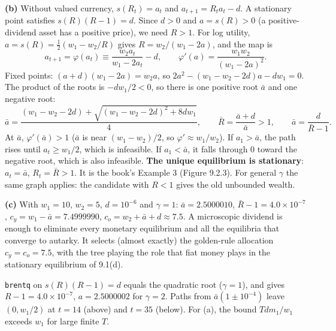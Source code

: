 \documentclass[12pt, letterpaper]{article}
\begin{document}
\begin{tcolorbox}[oddbox,title={Exercise 9.3 \quad A Lucas tree}]
\textbf{(b)} Without valued currency, $s(R_t)=a_t$ and $a_{t+1}=R_ta_t-d$. A stationary point
satisfies $s(R)(R-1)=d$. Since $d>0$ and $a=s(R)>0$ (a positive-dividend asset has a positive price),
we need $R>1$. For log utility, $a=s(R)=\frac12(w_1-w_2/R)$ gives $R=w_2/(w_1-2a)$, and the map is
\[
a_{t+1}=\varphi(a_t)\equiv\frac{w_2a_t}{w_1-2a_t}-d,\qquad \varphi'(a)=\frac{w_1w_2}{(w_1-2a)^2}.
\]
Fixed points: $(a+d)(w_1-2a)=w_2a$, so $2a^2-(w_1-w_2-2d)a-dw_1=0$. The product of the roots is
$-dw_1/2<0$, so there is one positive root $\bar a$ and one negative root:
\[
\bar a=\frac{(w_1-w_2-2d)+\sqrt{(w_1-w_2-2d)^2+8dw_1}}{4},\qquad \bar R=\frac{\bar a+d}{\bar a}>1,\qquad \bar a=\frac d{\bar R-1}.
\]
At $\bar a$, $\varphi'(\bar a)>1$ ($\bar a$ is near $(w_1-w_2)/2$, so $\varphi'\approx w_1/w_2$). If
$a_1>\bar a$, the path rises until $a_t\ge w_1/2$, which is infeasible. If $a_1<\bar a$, it falls
through $0$ toward the negative root, which is also infeasible. \textbf{The unique equilibrium is
stationary}: $a_t=\bar a$, $R_t=\bar R>1$. It is the book's Example 3 (Figure 9.2.3). For general
$\gamma$ the same graph applies: the candidate with $R<1$ gives the old unbounded wealth.

\textbf{(c)} With $w_1=10$, $w_2=5$, $d=10^{-6}$ and $\gamma=1$: $\bar a=2.5000010$,
$\bar R-1=4.0\times10^{-7}$, $c_y=w_1-\bar a=7.4999990$, $c_o=w_2+\bar a+d\approx7.5$. A
microscopic dividend is enough to eliminate every monetary equilibrium and all the equilibria that
converge to autarky. It selects (almost exactly) the golden-rule allocation $c_y=c_o=7.5$, with the
tree playing the role that fiat money plays in the stationary equilibrium of 9.1(d).

\begin{tcolorbox}[databox]
\texttt{brentq} on $s(R)(R-1)=d$ equals the quadratic root ($\gamma=1$), and gives $R-1=4.0\times10^{-7}$,
$a=2.5000002$ for $\gamma=2$. Paths from $\bar a(1\pm10^{-4})$ leave $(0,w_1/2)$ at $t=14$ (above)
and $t=35$ (below). For (a), the bound $Tdm_1/w_1$ exceeds $w_1$ for large finite $T$.
\end{tcolorbox}
\end{tcolorbox}
\end{document}

